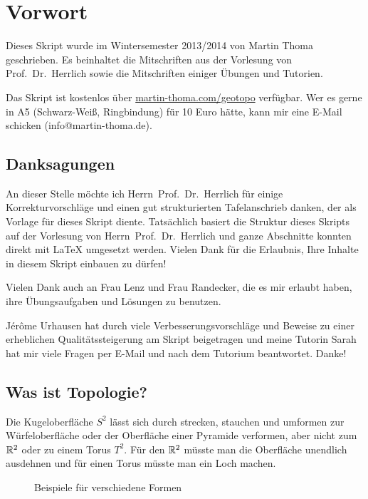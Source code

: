 \chapter*{Vorwort}
Dieses Skript wurde im Wintersemester 2013/2014
von Martin Thoma geschrieben. Es beinhaltet die Mitschriften aus
der Vorlesung von Prof.~Dr.~Herrlich sowie die Mitschriften einiger
Übungen und Tutorien.

Das Skript ist kostenlos über \href{http://martin-thoma.com/geotopo/}{martin-thoma.com/geotopo}
verfügbar. Wer es gerne in A5 (Schwarz-Weiß, Ringbindung) für 10 Euro hätte, 
kann mir eine E-Mail schicken (info@martin-thoma.de).

\section*{Danksagungen}
An dieser Stelle möchte ich Herrn~Prof.~Dr.~Herrlich für einige 
Korrekturvorschläge und einen gut strukturierten Tafelanschrieb 
danken, der als Vorlage für dieses Skript diente. Tatsächlich basiert
die Struktur dieses Skripts auf der Vorlesung von Herrn~Prof.~Dr.~Herrlich
und ganze Abschnitte konnten direkt mit \LaTeX{} umgesetzt werden.
Vielen Dank für die Erlaubnis, Ihre Inhalte in diesem Skript einbauen
zu dürfen!

Vielen Dank auch an Frau Lenz und Frau Randecker, die es mir erlaubt 
haben, ihre Übungsaufgaben und Lösungen zu benutzen.

Jérôme Urhausen hat durch viele Verbesserungsvorschläge und Beweise zu einer erheblichen
Qualitätssteigerung am Skript beigetragen und meine Tutorin Sarah hat mir
viele Fragen per E-Mail und nach dem Tutorium beantwortet. Danke!


\section*{Was ist Topologie?}

Die Kugeloberfläche $S^2$ lässt sich durch strecken, stauchen
und umformen zur Würfeloberfläche oder
der Oberfläche einer Pyramide verformen, aber nicht zum $\mdr^2$
oder zu einem Torus $T^2$. Für den $\mdr^2$ müsste man die Oberfläche
unendlich ausdehnen und für einen Torus müsste man ein Loch machen.

\begin{figure}[ht]
    \centering
    \subfloat[$S^2$]{
        
        \label{fig:s2}
    }%
    \subfloat[Würfel]{
        
        \label{fig:cube}
    }%
    \subfloat[Pyramide]{
        
        \label{fig:pyramide}
    }

    \subfloat[$\mdr^2$]{
        
        \label{fig:plane-r2}
    }%
    \label{fig:formen}
    \caption{Beispiele für verschiedene Formen}
\end{figure}

